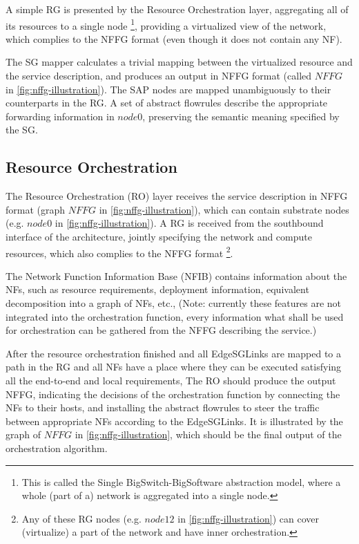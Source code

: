 \documentclass[a4paper,10pt]{scrartcl}
\begin{document}
A simple RG is presented by the Resource Orchestration layer, aggregating all of its resources to a single node
\footnote{This is called the Single BigSwitch-BigSoftware abstraction model, 
where a whole (part of a) network is aggregated into a single node.}, providing a virtualized view of the network,
which complies to the NFFG format (even though it does not contain any NF).

The SG mapper calculates a trivial mapping between the virtualized resource and the service description,
and produces an output in NFFG format (called $NFFG$ in \ref{fig:nffg-illustration}). 
The SAP nodes are mapped unambiguously to their counterparts in the RG.
A set of abstract flowrules describe the appropriate forwarding information in $node0$, 
preserving the semantic meaning specified by the SG.

\subsection{Resource Orchestration}

The Resource Orchestration (RO) layer receives the service description in NFFG format 
(graph $NFFG$ in \ref{fig:nffg-illustration}),
which can contain substrate nodes (e.g. $node0$ in \ref{fig:nffg-illustration}).
A RG is received from the southbound interface of the architecture, 
jointly specifying the network and compute resources, which also complies to the NFFG format
\footnote{Any of these RG nodes (e.g. $node12$ in \ref{fig:nffg-illustration}) 
can cover (virtualize) a part of the network and have inner orchestration.}.

The Network Function Information Base (NFIB) contains information about the NFs, 
such as resource requirements, deployment information, equivalent decomposition into a graph of NFs, etc., 
(Note: currently these features are not integrated into the orchestration function, 
every information what shall be used for orchestration can be gathered from the NFFG describing the service.)

After the resource orchestration finished and all EdgeSGLinks are mapped to a path in the RG 
and all NFs have a place where they can be executed satisfying all the end-to-end and local requirements,
The RO should produce the output NFFG, indicating the decisions of the orchestration function by 
connecting the NFs to their hosts, and installing the abstract flowrules to steer the traffic between 
appropriate NFs according to the EdgeSGLinks. It is illustrated by the graph of $NFFG$ in \ref{fig:nffg-illustration},
which should be the final output of the orchestration algorithm.
\end{document}
